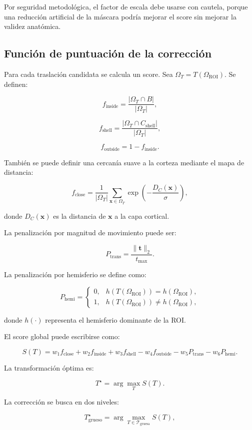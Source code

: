\documentclass[12pt,a4paper]{article}
\begin{document}
Por seguridad metodológica, el factor de escala debe usarse con cautela, porque una reducción artificial de la máscara podría mejorar el score sin mejorar la validez anatómica.

\subsection{Función de puntuación de la corrección}

Para cada traslación candidata se calcula un score. Sea \(\Omega_T=T(\Omega_{\text{ROI}})\). Se definen:

\[
f_{\text{inside}}
=
\frac{|\Omega_T\cap B|}{|\Omega_T|},
\]

\[
f_{\text{shell}}
=
\frac{|\Omega_T\cap C_{\text{shell}}|}{|\Omega_T|},
\]

\[
f_{\text{outside}}
=
1-f_{\text{inside}}.
\]

También se puede definir una cercanía suave a la corteza mediante el mapa de distancia:

\[
f_{\text{close}}
=
\frac{1}{|\Omega_T|}
\sum_{\mathbf{x}\in\Omega_T}
\exp\left(-\frac{D_C(\mathbf{x})}{\sigma}\right),
\]

donde \(D_C(\mathbf{x})\) es la distancia de \(\mathbf{x}\) a la capa cortical.

La penalización por magnitud de movimiento puede ser:

\[
P_{\text{trans}}
=
\frac{\|\mathbf{t}\|_2}{t_{\max}}.
\]

La penalización por hemisferio se define como:

\[
P_{\text{hemi}} =
\begin{cases}
0, & h(T(\Omega_{\text{ROI}}))=h(\Omega_{\text{ROI}}),\\
1, & h(T(\Omega_{\text{ROI}}))\neq h(\Omega_{\text{ROI}}),
\end{cases}
\]

donde \(h(\cdot)\) representa el hemisferio dominante de la ROI.

El score global puede escribirse como:

\[
S(T)
=
w_1 f_{\text{close}}
+
w_2 f_{\text{inside}}
+
w_3 f_{\text{shell}}
-
w_4 f_{\text{outside}}
-
w_5 P_{\text{trans}}
-
w_6 P_{\text{hemi}}.
\]

La transformación óptima es:

\[
T^\star =
\arg\max_T S(T).
\]

La corrección se busca en dos niveles:

\[
T^\star_{\text{grueso}}
=
\arg\max_{T\in\mathcal{T}_{\text{gruesa}}} S(T),
\]
\end{document}

